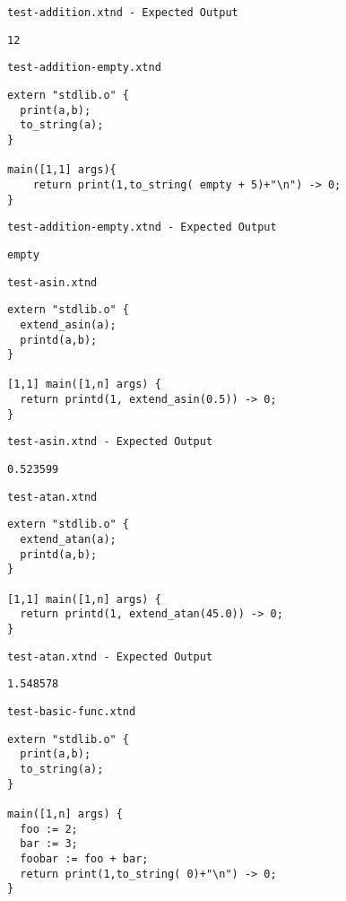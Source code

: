 \medskip \noindent \texttt{test-addition.xtnd - Expected Output}


\begin{lstlisting}
12
\end{lstlisting}


\medskip \noindent \texttt{test-addition-empty.xtnd}


\begin{lstlisting}
extern "stdlib.o" {
  print(a,b);
  to_string(a);
}

main([1,1] args){
	return print(1,to_string( empty + 5)+"\n") -> 0;
}
\end{lstlisting}


\medskip \noindent \texttt{test-addition-empty.xtnd - Expected Output}


\begin{lstlisting}
empty
\end{lstlisting}


\medskip \noindent \texttt{test-asin.xtnd}


\begin{lstlisting}
extern "stdlib.o" {
  extend_asin(a);
  printd(a,b);
}

[1,1] main([1,n] args) {
  return printd(1, extend_asin(0.5)) -> 0;
}
\end{lstlisting}


\medskip \noindent \texttt{test-asin.xtnd - Expected Output}


\begin{lstlisting}
0.523599
\end{lstlisting}


\medskip \noindent \texttt{test-atan.xtnd}


\begin{lstlisting}
extern "stdlib.o" {
  extend_atan(a);
  printd(a,b);
}

[1,1] main([1,n] args) {
  return printd(1, extend_atan(45.0)) -> 0;
}
\end{lstlisting}


\medskip \noindent \texttt{test-atan.xtnd - Expected Output}


\begin{lstlisting}
1.548578
\end{lstlisting}


\medskip \noindent \texttt{test-basic-func.xtnd}


\begin{lstlisting}
extern "stdlib.o" {
  print(a,b);
  to_string(a);
}

main([1,n] args) {
  foo := 2;
  bar := 3;
  foobar := foo + bar;
  return print(1,to_string( 0)+"\n") -> 0;
}
\end{lstlisting}


